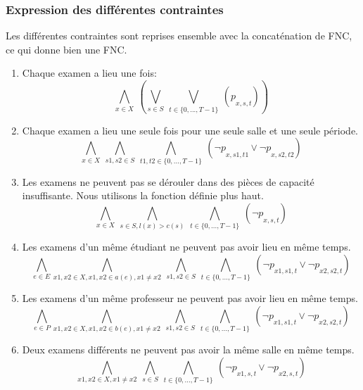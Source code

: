 \documentclass[a4paper,10pt]{article}
\begin{document}
\subsubsection{Expression des différentes contraintes}
Les différentes contraintes sont reprises ensemble avec la concaténation de FNC, ce qui donne bien une FNC.
\begin{enumerate}
\item
Chaque examen a lieu une fois:
\begin{equation}
\bigwedge\limits_{x \in X}\ (\bigvee \limits_{s \in S}\ \bigvee \limits_{t \in \{0,...,T-1\} }\ ( p\underset{x,s,t}\ ))
\end{equation}
\item
Chaque examen a lieu une seule fois pour une seule salle et une seule période.
\begin{equation}
\bigwedge\limits_{x \in X}\ \bigwedge\limits_{s1,s2 \in S}\ \bigwedge\limits_{t1,t2 \in \{0,...,T-1\}}\ ( \neg p\underset{x,s1,t1}\ \lor \neg p\underset{x,s2,t2}\ )
\end{equation}
\item
Les examens ne peuvent pas se dérouler dans des pièces de capacité insuffisante.
Nous utilisons la fonction définie plus haut.
\begin{equation}
\bigwedge\limits_{x \in X}\ \bigwedge\limits_{s \in S, l(x) > c(s)}\ \bigwedge\limits_{t \in \{0,...,T-1\}}\ ( \neg p\underset{x,s,t}\ )
\end{equation}
\item
Les examens d'un même étudiant ne peuvent pas avoir lieu en même temps.
\begin{equation}
\bigwedge\limits_{e \in E}
\bigwedge\limits_{x1,x2 \in X, x1,x2 \in a(e), x1 \neq x2}\ \bigwedge\limits_{s1,s2 \in S}\ \bigwedge\limits_{t \in \{0,...,T-1\}}\ ( \neg p\underset{x1,s1,t}\ \lor \neg p\underset{x2,s2,t}\ )
\end{equation}
\item
Les examens d'un même professeur ne peuvent pas avoir lieu en même temps.
\begin{equation}
\bigwedge\limits_{e \in P}
\bigwedge\limits_{x1,x2 \in X, x1,x2 \in b(e), x1 \neq x2}\ \bigwedge\limits_{s1,s2 \in S}\ \bigwedge\limits_{t \in \{0,...,T-1\}}\ ( \neg p\underset{x1,s1,t}\ \lor \neg p\underset{x2,s2,t}\ )
\end{equation}
\item
Deux examens différents ne peuvent pas avoir la même salle en même temps.
\begin{equation}
\bigwedge\limits_{x1,x2 \in X, x1 \neq x2}\ \bigwedge\limits_{s \in S}\ \bigwedge\limits_{t \in \{0,...,T-1\}}\ ( \neg p\underset{x1,s,t}\ \lor \neg p\underset{x2,s,t}\ )
\end{equation}
\end{enumerate}
\end{document}
